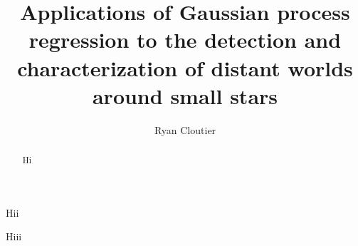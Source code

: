 \documentclass{ut-thesis}
\author{Ryan Cloutier}
\title{Applications of Gaussian process regression to the detection
and characterization of distant worlds around small stars}
\begin{document}
\begin{preliminary}

\maketitle

\begin{abstract}
  Hi
\end{abstract}


\begin{dedication}
  Hii
\end{dedication}
\newpage

\begin{acknowledgements}
  Hiii
\end{acknowledgements}
\newpage

\tableofcontents
\listoftables
\listoffigures

\end{preliminary}


%
%
%





\end{document}
